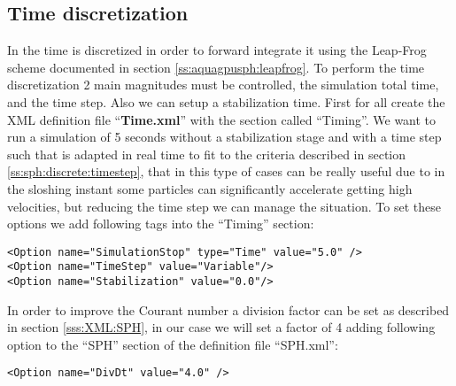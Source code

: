 \subsection{Time discretization}
\label{ss:example:lateral_water_1x_deleffe:timing}
%
In \NAME the time is discretized in order to forward integrate it using the Leap-Frog scheme
documented in section \ref{ss:aquagpusph:leapfrog}. To perform the time discretization 2 main
magnitudes must be controlled, the simulation total time, and the time step. Also we can setup
a stabilization time.\rc
%
First for all create the XML definition file ``\textbf{Time.xml}'' with the section called
``Timing''. We want to run a simulation of 5 seconds without a stabilization stage and with a
time step such that is adapted in real time to fit to the criteria described in section
\ref{ss:sph:discrete:timestep}, that in this type of cases can be really useful due to in the
sloshing instant some particles can significantly accelerate getting high velocities, but
reducing the time step we can manage the situation. To set these options we add following tags
into the ``Timing'' section:
%
\begin{verbatim}
<Option name="SimulationStop" type="Time" value="5.0" />
<Option name="TimeStep" value="Variable"/>
<Option name="Stabilization" value="0.0"/>
\end{verbatim}
%
In order to improve the Courant number a division factor can be set as described in section
\ref{sss:XML:SPH}, in our case we will set a factor of 4 adding following option to the ``SPH''
section of the definition file ``SPH.xml'':
%
\begin{verbatim}
<Option name="DivDt" value="4.0" />
\end{verbatim}
%
